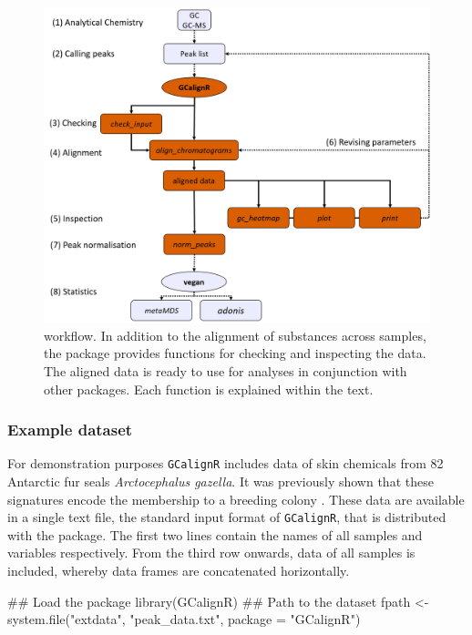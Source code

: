\begin{figure}[htbp]
\centering
\includegraphics[width=13cm]{figures/workflow}
\caption{ workflow. In addition to the alignment of substances across samples, the package provides functions for checking and inspecting the data. The aligned data is ready to use for analyses in conjunction with other packages. Each function is explained within the text.}
\label{figure:workflow}
\end{figure}

\subsubsection{Example dataset}\label{example-dataset}

For demonstration purposes \texttt{GCalignR} includes data of skin
chemicals from 82 Antarctic fur seals \textit{Arctocephalus gazella}. It
was previously shown that these signatures encode the membership to a
breeding colony \cite{Stoffel.2015}. These data are available in a
single text file, the standard input format of \texttt{GCalignR}, that
is distributed with the package. The first two lines contain the names
of all samples and variables respectively. From the third row onwards,
data of all samples is included, whereby data frames are concatenated
horizontally.

\begin{Schunk}
\begin{Sinput}
## Load the package
library(GCalignR)
## Path to the dataset
fpath <- system.file("extdata", "peak_data.txt", package = "GCalignR")
\end{Sinput}
\end{Schunk}

